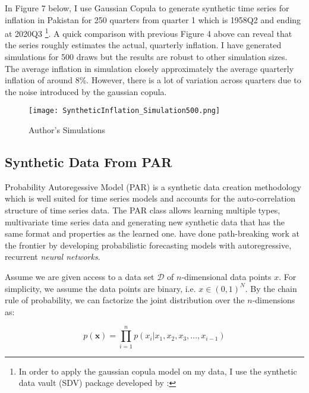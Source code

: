 \documentclass[12pt]{article}
\newcommand{\1}{\mathbbm 1}
\begin{document}
		In Figure 7 below, I use Gaussian Copula to generate synthetic time series for inflation in Pakistan for 250 quarters from quarter 1 which is 1958Q2 and ending at 2020Q3 \footnote{In order to apply the gaussian copula model on my data, I use the synthetic data vault (SDV) package developed by \cite{patki2016synthetic}: {\color{blue}{https://sdv.dev/}}}. A quick comparison with previous Figure 4 above can reveal that the series roughly estimates the actual, quarterly inflation. I have generated simulations for 500 draws but the results are robust to other simulation sizes. The average inflation in simulation closely approximately the average quarterly inflation of around 8\%. However, there is a lot of variation across quarters due to the noise introduced by the gaussian copula.
		
		
		
		
		
		
		
		\begin{figure}[H]
			\begin{Center}
				\texttt{[image: SyntheticInflation\_Simulation500.png]}
				\caption{Author's Simulations}
			\end{Center}
		\end{figure}
		
		\subsection{Synthetic Data From PAR}
		
		Probability Autoregessive Model (PAR) is a synthetic data creation methodology which is well suited for time series models and accounts for the auto-correlation structure of time series data. The PAR class allows learning multiple types, multivariate time series data and generating new synthetic data that has the same format and properties as the learned one. \cite{salinas2020deepar} have done path-breaking work at the frontier by developing probabilistic forecasting models with autoregressive, recurrent \textit{neural networks}.
		
	    Assume we are given access to a data set $\mathcal{D}$ of $n$-dimensional data points $x$. For simplicity, we assume the data points are binary, i.e. $x \in (0, 1)^{N}$. By the chain rule of probability, we can factorize the joint distribution over the $n$-dimensions as:
	    
	    \begin{equation}
	    	p(\mathbf{x}) = \prod_{i = 1}^{n} p(x_{i} | x_{1}, x_{2}, x_{3}, ..., x_{i-1})
	    \end{equation}
	    
\end{document}
